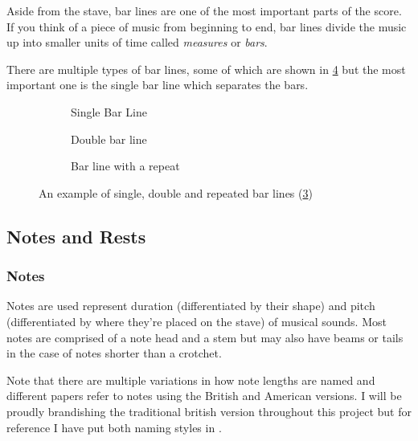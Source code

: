 Aside from the stave, bar lines are one of the most important parts of the score. If you think of a piece of music from beginning to end, bar lines divide the music up into smaller units of time called \emph{measures} or \emph{bars}.

There are multiple types of bar lines, some of which are shown in \cref{fig:bar-line-types} but the most important one is the single bar line which separates the bars.

\begin{figure}[H]
  \centering

  \begin{subfigure}[b]{.3\linewidth}
      \centering
      \caption{Single Bar Line}
      \label{fig:single-bar-line}
  \end{subfigure}
  \begin{subfigure}[b]{.3\linewidth}
      \centering
      \caption{Double bar line}
      \label{fig:double-bar-line}
  \end{subfigure}
  \begin{subfigure}[b]{.3\linewidth}
      \centering
      \caption{Bar line with a repeat}
      \label{fig:repeat-bar-line}
  \end{subfigure}

  \caption{An example of single, double and repeated bar lines (\cref{fig:repeat-bar-line})}
  \label{fig:bar-line-types}
\end{figure}

\subsection{Notes and Rests}

\subsubsection{Notes}
\label{sec:music-theory-notes}
Notes are used represent duration (differentiated by their shape) and pitch (differentiated by where they're placed on the stave) of musical sounds. Most notes are comprised of a note head and a stem but may also have beams or tails in the case of notes shorter than a crotchet.

Note that there are multiple variations in how note lengths are named and different papers refer to notes using the British and American versions. I will be proudly brandishing the traditional british version throughout this project but for reference I have put both naming styles in .

